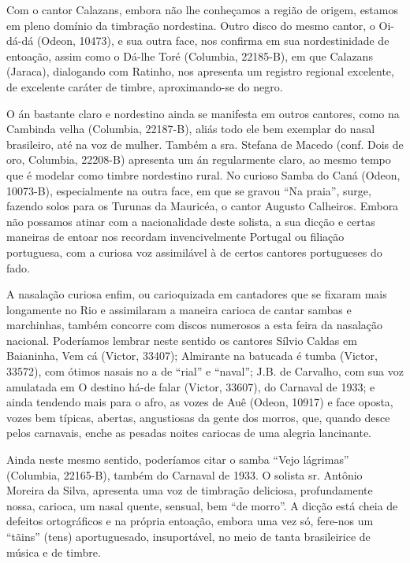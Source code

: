 Com o cantor Calazans, embora não lhe conheçamos a região de origem,
estamos em pleno domínio da timbração nordestina. Outro disco do mesmo
cantor, o Oi-dá-dá (Odeon, 10473), e sua outra face, nos confirma em sua
nordestinidade de entoação, assim como o Dá-lhe Toré (Columbia,
22185-B), em que Calazans (Jaraca), dialogando com Ratinho, nos
apresenta um registro regional excelente, de excelente caráter de
timbre, aproximando-se do negro.

O án bastante claro e nordestino ainda se manifesta em outros cantores,
como na Cambinda velha (Columbia, 22187-B), aliás todo ele bem exemplar
do nasal brasileiro, até na voz de mulher. Também a sra. Stefana de
Macedo (conf. Dois de oro, Columbia, 22208-B) apresenta um án
regularmente claro, ao mesmo tempo que é modelar como timbre nordestino
rural. No curioso Samba do Caná (Odeon, 10073-B), especialmente na outra
face, em que se gravou ``Na praia'', surge, fazendo solos para os
Turunas da Mauricéa, o cantor Augusto Calheiros. Embora não possamos
atinar com a nacionalidade deste solista, a sua dicção e certas maneiras
de entoar nos recordam invencivelmente Portugal ou filiação portuguesa,
com a curiosa voz assimilável à de certos cantores portugueses do fado.

A nasalação curiosa enfim, ou carioquizada em cantadores que se fixaram
mais longamente no Rio e assimilaram a maneira carioca de cantar sambas
e marchinhas, também concorre com discos numerosos a esta feira da
nasalação nacional. Poderíamos lembrar neste sentido os cantores Sílvio
Caldas em Baianinha, Vem cá (Victor, 33407); Almirante na batucada é
tumba (Victor, 33572), com ótimos nasais no a de ``rial'' e ``naval'';
J.B. de Carvalho, com sua voz amulatada em O destino há-de falar
(Victor, 33607), do Carnaval de 1933; e ainda tendendo mais para o afro,
as vozes de Auê (Odeon, 10917) e face oposta, vozes bem típicas,
abertas, angustiosas da gente dos morros, que, quando desce pelos
carnavais, enche as pesadas noites cariocas de uma alegria lancinante.

Ainda neste mesmo sentido, poderíamos citar o samba ``Vejo lágrimas''
(Columbia, 22165-B), também do Carnaval de 1933. O solista sr. Antônio
Moreira da Silva, apresenta uma voz de timbração deliciosa,
profundamente nossa, carioca, um nasal quente, sensual, bem ``de
morro''. A dicção está cheia de defeitos ortográficos e na própria
entoação, embora uma vez só, fere-nos um ``tãins'' (tens) aportuguesado,
insuportável, no meio de tanta brasileirice de música e de timbre.

